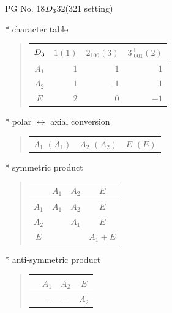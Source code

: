 \documentclass[fleqn,8pt,landscape]{jsarticle}
\begin{document}
\setcounter{MaxMatrixCols}{32}

\renewcommand{\tablename}{Table~}
\renewcommand{\figurename}{Figure~}
\begin{center}
\LARGE
PG No. 18\quad$D_{\rm 3}$\quad$32$\quad(321 setting)\quad[ trigonal ]
\end{center}

* character table
\begin{quote}
\begin{tabular}{crrr} \hline \hline
$ D_{\rm 3} $ & $ 1(1) $ & $ 2{}_{100}(3) $ & $ 3^{+}_{\,\,001}(2) $ \\ \hline
$ A_{1} $ & $ 1 $ & $ 1 $ & $ 1 $ \\
$ A_{2} $ & $ 1 $ & $ -1 $ & $ 1 $ \\
$ E $ & $ 2 $ & $ 0 $ & $ -1 $ \\
 \hline \hline
\end{tabular}
\end{quote}

* polar $\leftrightarrow$ axial conversion
\begin{quote}
\begin{tabular}{ccc}
$ A_{1}\,\,(A_{1}) $ & $ A_{2}\,\,(A_{2}) $ & $ E\,\,(E) $
\end{tabular}
\end{quote}

* symmetric product
\begin{quote}
\begin{tabular}{c|ccc} \hline \hline
 & $ A_{1} $ & $ A_{2} $ & $ E $ \\ \hline
$ A_{1} $ & $ A_{1} $ & $ A_{2} $ & $ E $ \\
$ A_{2} $ & $  $ & $ A_{1} $ & $ E $ \\
$ E $ & $  $ & $  $ & $ A_{1} + E $ \\
 \hline \hline
\end{tabular}
\end{quote}

* anti-symmetric product
\begin{quote}
\begin{tabular}{cccc} \hline \hline
 & $ A_{1} $ & $ A_{2} $ & $ E $ \\ \hline
$  $ & $ - $ & $ - $ & $ A_{2} $ \\
 \hline \hline
\end{tabular}
\end{quote}
\end{document}

